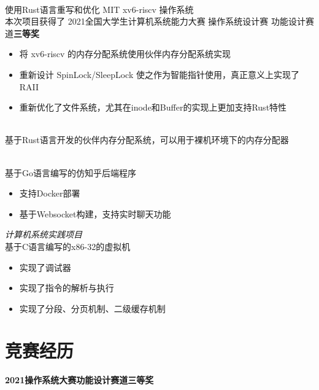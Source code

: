 \documentclass{cv}
\begin{document}
\\
使用Rust语言重写和优化 MIT xv6-riscv 操作系统
\\
本次项目获得了 2021全国大学生计算机系统能力大赛 操作系统设计赛 功能设计赛道\textbf{三等奖}
\begin{itemize}
  \item 将 xv6-riscv 的内存分配系统使用伙伴内存分配系统实现
  \item 重新设计 SpinLock/SleepLock 使之作为智能指针使用，真正意义上实现了 RAII
  \item 重新优化了文件系统，尤其在inode和Buffer的实现上更加支持Rust特性
\end{itemize}


\\
基于Rust语言开发的伙伴内存分配系统，可以用于裸机环境下的内存分配器

\\
基于Go语言编写的仿知乎后端程序
\begin{itemize}
  \item 支持Docker部署
  \item 基于Websocket构建，支持实时聊天功能
\end{itemize}

{\it 计算机系统实践项目}
\vspace{0.4ex}
\\ 基于C语言编写的x86-32的虚拟机
\begin{itemize}
  \item 实现了调试器
  \item 实现了指令的解析与执行
  \item 实现了分段、分页机制、二级缓存机制
\end{itemize}

\section{竞赛经历}
\textbf{2021操作系统大赛功能设计赛道}\quad \textbf{三等奖}
\end{document}
